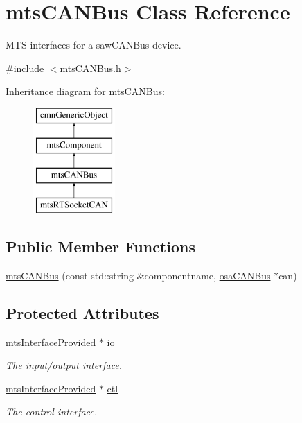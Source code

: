 \hypertarget{classmts_c_a_n_bus}{}\section{mts\+C\+A\+N\+Bus Class Reference}
\label{classmts_c_a_n_bus}


M\+T\+S interfaces for a saw\+C\+A\+N\+Bus device.  




{\ttfamily \#include $<$mts\+C\+A\+N\+Bus.\+h$>$}

Inheritance diagram for mts\+C\+A\+N\+Bus\+:\begin{figure}[H]
\begin{center}
\leavevmode
\includegraphics[height=4.000000cm]{db/de1/classmts_c_a_n_bus}
\end{center}
\end{figure}
\subsection*{Public Member Functions}
\begin{DoxyCompactItemize}
\item 
\hyperlink{classmts_c_a_n_bus_aee41c73121b347bf181bf51ff0cfa3ae}{mts\+C\+A\+N\+Bus} (const std\+::string \&componentname, \hyperlink{classosa_c_a_n_bus}{osa\+C\+A\+N\+Bus} $\ast$can)
\end{DoxyCompactItemize}
\subsection*{Protected Attributes}
\begin{DoxyCompactItemize}
\item 
\hyperlink{classmts_interface_provided}{mts\+Interface\+Provided} $\ast$ \hyperlink{classmts_c_a_n_bus_a273a160e43d6b59b9f451c7ef8c1f93e}{io}
\begin{DoxyCompactList}\small\item\em The input/output interface. \end{DoxyCompactList}\item 
\hyperlink{classmts_interface_provided}{mts\+Interface\+Provided} $\ast$ \hyperlink{classmts_c_a_n_bus_ae87e117a52479bae3ec4464f2448e8c2}{ctl}
\begin{DoxyCompactList}\small\item\em The control interface. \end{DoxyCompactList}\end{DoxyCompactItemize}
